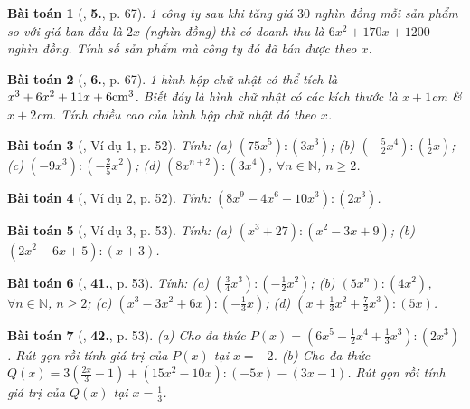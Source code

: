 \documentclass{article}
\numberwithin{equation}{section}
\newtheorem{baitoan}{Bài toán}
\begin{document}
\begin{baitoan}[\cite{SGK_Toan_7_Canh_Dieu_tap_2}, \textbf{5.}, p. 67]
	1 công ty sau khi tăng giá $30$ nghìn đồng mỗi sản phẩm so với giá ban đầu là $2x$ (nghìn đồng) thì có doanh thu là $6x^2 + 170x + 1200$ nghìn đồng. Tính số sản phẩm mà công ty đó đã bán được theo $x$.
\end{baitoan}

\begin{baitoan}[\cite{SGK_Toan_7_Canh_Dieu_tap_2}, \textbf{6.}, p. 67]
	1 hình hộp chữ nhật có thể tích là $x^3 + 6x^2 + 11x + 6{\rm cm}^3$. Biết đáy là hình chữ nhật có các kích thước là $x + 1$\emph{cm} \& $x + 2$\emph{cm}. Tính chiều cao của hình hộp chữ nhật đó theo $x$.
\end{baitoan}

\begin{baitoan}[\cite{SBT_Toan_7_Canh_Dieu_tap_2}, Ví dụ 1, p. 52]
	Tính: (a) $(75x^5):(3x^3)$; (b) $\left(-\frac{5}{2}x^4\right):\left(\frac{1}{2}x\right)$; (c) $(-9x^3):\left(-\frac{2}{5}x^2\right)$; (d) $(8x^{n+2}):(3x^4)$, $\forall n\in\mathbb{N}$, $n\ge2$.
\end{baitoan}

\begin{baitoan}[\cite{SBT_Toan_7_Canh_Dieu_tap_2}, Ví dụ 2, p. 52]
	Tính: $(8x^9 - 4x^6 + 10x^3):(2x^3)$.
\end{baitoan}

\begin{baitoan}[\cite{SBT_Toan_7_Canh_Dieu_tap_2}, Ví dụ 3, p. 53]
	Tính: (a) $(x^3 + 27):(x^2 - 3x + 9)$; (b) $(2x^2 - 6x + 5):(x + 3)$.
\end{baitoan}

\begin{baitoan}[\cite{SBT_Toan_7_Canh_Dieu_tap_2}, \textbf{41.}, p. 53]
	Tính: (a) $\left(\frac{3}{4}x^3\right):\left(-\frac{1}{2}x^2\right)$; (b) $(5x^n):(4x^2)$, $\forall n\in\mathbb{N}$, $n\ge2$; (c) $(x^3 - 3x^2 + 6x):\left(-\frac{1}{3}x\right)$; (d) $\left(x + \frac{1}{3}x^2 + \frac{7}{2}x^3\right):(5x)$.
\end{baitoan}

\begin{baitoan}[\cite{SBT_Toan_7_Canh_Dieu_tap_2}, \textbf{42.}, p. 53]
	(a) Cho đa thức $P(x) = \left(6x^5 - \frac{1}{2}x^4 + \frac{1}{3}x^3\right):(2x^3)$. Rút gọn rồi tính giá trị của $P(x)$ tại $x = -2$. (b) Cho đa thức $Q(x) = 3\left(\frac{2x}{3} - 1\right) + (15x^2 - 10x):(-5x) - (3x - 1)$. Rút gọn rồi tính giá trị của $Q(x)$ tại $x = \frac{1}{3}$.
\end{baitoan}
\end{document}
